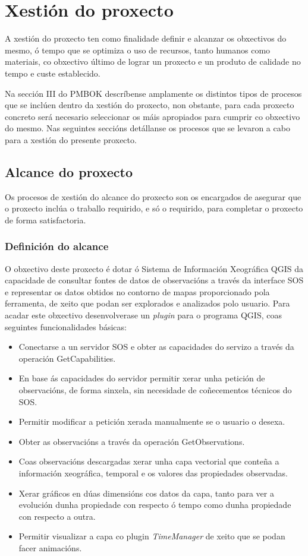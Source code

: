 \chapter{Xestión do proxecto}
A xestión do proxecto ten como finalidade definir e alcanzar os obxectivos do mesmo, ó tempo que se optimiza o uso de recursos, tanto humanos como materiais, co obxectivo último de lograr un proxecto e un produto de calidade no tempo e custe establecido.

Na sección III do PMBOK\cite{PMBOK} descríbense amplamente os distintos tipos de procesos que se inclúen dentro da xestión do proxecto, non obstante, para cada proxecto concreto será necesario seleccionar os máis apropiados para cumprir co obxectivo do mesmo. Nas seguintes seccións detállanse os procesos que se levaron a cabo para a xestión do presente proxecto.

\section{Alcance do proxecto}
Os procesos de xestión do alcance do proxecto son os encargados de asegurar que o proxecto inclúa o traballo requirido, e só o requirido, para completar o proxecto de forma satisfactoria.

\subsection{Definición do alcance}\label{subsec:DefAlcance}
O obxectivo deste proxecto é dotar ó Sistema de Información Xeográfica QGIS da capacidade de consultar fontes de datos de observacións a través da interface SOS e representar os datos obtidos no contorno de mapas proporcionado pola ferramenta, de xeito que podan ser explorados e analizados polo usuario. Para acadar este obxectivo desenvolverase un \emph{plugin} para o programa QGIS, coas seguintes funcionalidades básicas:

\begin{itemize}
\item Conectarse a un servidor SOS e obter as capacidades do servizo a través da operación GetCapabilities.
\item En base ás capacidades do servidor permitir xerar unha petición de observacións, de forma sinxela, sin necesidade de coñecementos técnicos do SOS.
\item Permitir modificar a petición xerada manualmente se o usuario o desexa.
\item Obter as observacións a través da operación GetObservations.
\item Coas observacións descargadas xerar unha capa vectorial que conteña a información xeográfica, temporal e os valores das propiedades observadas.
\item Xerar gráficos en dúas dimensións cos datos da capa, tanto para ver a evolución dunha propiedade con respecto ó tempo como dunha propiedade con respecto a outra.
\item Permitir visualizar a capa co plugin \emph{TimeManager} de xeito que se podan facer animacións.
\end{itemize}

